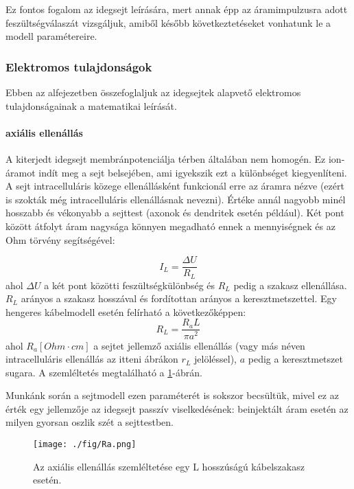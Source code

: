 Ez fontos fogalom az idegsejt leírására, mert annak épp az áramimpulzusra adott feszültségválaszát vizsgáljuk, amiből később következtetéseket vonhatunk le a modell paramétereire.



\subsubsection{Elektromos tulajdonságok}
Ebben az alfejezetben összefoglaljuk az idegsejtek alapvető elektromos tulajdonságainak a matematikai leírását.

\paragraph{axiális ellenállás}\label{par:Ra}
A kiterjedt idegsejt membránpotenciálja térben általában nem homogén. Ez ion-áramot indít meg a sejt belsejében, ami igyekszik ezt a különbséget kiegyenlíteni. A sejt intracelluláris közege ellenállásként funkcionál erre az áramra nézve (ezért is szokták még intracelluláris ellenállásnak nevezni). Értéke annál nagyobb minél hosszabb és vékonyabb a sejttest (axonok és dendritek esetén például). Két pont között átfolyt áram nagysága könnyen megadható ennek a mennyiségnek és az Ohm törvény segítségével:

\begin{equation}
	I_L = \dfrac{\Delta U}{R_L}
\end{equation}
ahol $\Delta U$ a két pont közötti feszültségkülönbség és $R_L$ pedig a szakasz ellenállása.
$R_L$ arányos a szakasz hosszával és fordítottan arányos a keresztmetszettel. Egy hengeres kábelmodell esetén felírható a következőképpen:
\begin{equation}\label{eq:r_L}
	R_L = \dfrac{R_a L}{\pi a^2}
\end{equation}
ahol $R_a [Ohm\cdot cm]$ a sejtet jellemző axiális ellenállás (vagy más néven intracelluláris ellenállás az itteni ábrákon $r_L$ jelöléssel), $a$ pedig a keresztmetszet sugara. A szemléltetés megtalálható a \ref{fig:Ra}-ábrán.

Munkánk során a sejtmodell ezen paraméterét is sokszor becsültük, mivel ez az érték egy jellemzője az idegsejt passzív viselkedésének: beinjektált áram esetén az milyen gyorsan oszlik szét a sejttestben.


\begin{figure}[!htb]
	\centering
	\texttt{[image: ./fig/Ra.png]}
	\caption[Axiális ellenállás]{\cite{dayan2001theoretical} Az axiális ellenállás szemléltetése egy L hosszúságú kábelszakasz esetén.}
	\label{fig:Ra}
\end{figure}


